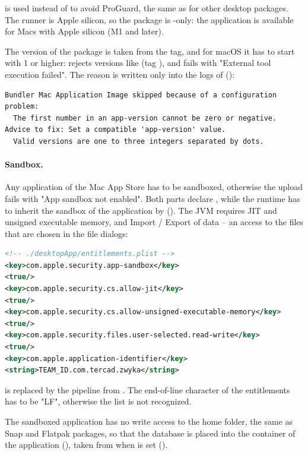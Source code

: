 \noindent {} is used instead of  to avoid ProGuard, the same as for other desktop
packages. The runner is Apple silicon, so the package is -only: the application is available for Macs with
Apple silicon (M1 and later).

The version of the package is taken from the tag, and for macOS it has to start with 1 or higher:  rejects
versions like  (tag ), and  fails with "External tool execution
failed". The reason is written only into the logs of 
():

\begin{lstlisting}[language=terminal]
Bundler Mac Application Image skipped because of a configuration problem:
  The first number in an app-version cannot be zero or negative.
Advice to fix: Set a compatible 'app-version' value.
  Valid versions are one to three integers separated by dots.
\end{lstlisting}

\paragraph{Sandbox.} Any application of the Mac App Store has to be sandboxed, otherwise the upload fails with "App
sandbox not enabled". Both parts declare , while the runtime has to inherit the
sandbox of the application by  (). The JVM
requires JIT and unsigned executable memory, and Import / Export of data -- an access to the files that are chosen in the
file dialogs:

\begin{lstlisting}[language=xml]
<!-- ./desktopApp/entitlements.plist -->
<key>com.apple.security.app-sandbox</key>
<true/>
<key>com.apple.security.cs.allow-jit</key>
<true/>
<key>com.apple.security.cs.allow-unsigned-executable-memory</key>
<true/>
<key>com.apple.security.files.user-selected.read-write</key>
<true/>
<key>com.apple.application-identifier</key>
<string>TEAM_ID.com.tercad.zwyka</string>
\end{lstlisting}

\noindent {} is replaced by the pipeline from . The end-of-line character of the
entitlements has to be "LF", otherwise the list is not recognized.

The sandboxed application has no write access to the home folder, the same as Snap and Flatpak packages, so that the
database is placed into the container of the application (),
taken from  when  is set ().

